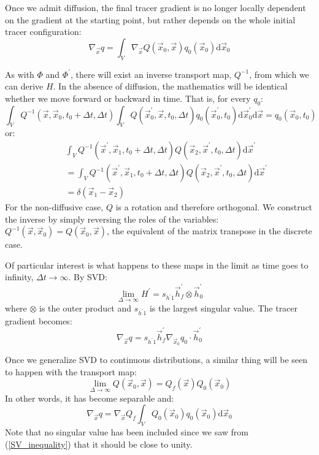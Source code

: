 \documentclass[11pt]{article}
\begin{document}
Once we admit diffusion, the final tracer gradient is no longer locally 
dependent on the gradient at the starting point, but rather depends on the
whole initial tracer configuration:
\begin{equation}
	\nabla_{\vec x} q = \int_V \nabla_{\vec x} Q(\vec x_0, \vec x) q_0 (\vec x_0) \mathrm d \vec x_0
\end{equation}

As with $\Phi$ and $\Phi^\prime$, 
there will exist an inverse transport map, $Q^{-1}$, from which we can derive
$H$. In the absence of diffusion, the mathematics will be identical whether
we move forward or backward in time.
That is, for every $q_0$:
\begin{equation}
	\int_V Q^{-1}(\vec x, \vec x_0, t_0+\Delta t, \Delta t) 
	\int_V Q(\vec x_0^\prime, \vec x, t_0, \Delta t) 
	q_0(\vec x_0^\prime, t_0) 
	\mathrm d \vec x_0^\prime \mathrm d \vec x = q_0(\vec x_0, t_0)
\end{equation}
or:
\begin{eqnarray}
	& & \int_V  Q^{-1}(\vec x^\prime, \vec x_1, t_0+\Delta t, \Delta t)
	Q(\vec x_2, \vec x^\prime, t_0, \Delta t) \mathrm d \vec x^\prime \\
	& & = \int_V  Q^{-1}(\vec x^\prime, \vec x_1, t_0+\Delta t, \Delta t)
	Q(\vec x_2, \vec x^\prime, t_0, \Delta t) \mathrm d \vec x^\prime \\ 
	& & = \delta(\vec x_1 - \vec x_2)
\end{eqnarray}
For the non-diffusive case, $Q$ is a rotation and therefore orthogonal.
We construct the inverse by simply reversing the roles of the variables:
$Q^{-1}(\vec x, \vec x_0) = Q(\vec x_0, \vec x)$, 
the equivalent of the matrix transpose in the discrete case.

Of particular interest is what happens to these maps in the limit as time
goes to infinity, $\Delta t \rightarrow \infty$.
By SVD:
\begin{equation}
	\lim_{\Delta \rightarrow \infty} H^\prime = 
	s_{h^\prime1} \vec h_f^\prime \otimes \vec h_0^\prime
\end{equation}
where $\otimes$ is the outer product and $s_{h^\prime1}$ is the largest 
singular value. The tracer gradient becomes:
\begin{equation}
	\nabla_{\vec x} q = s_{h^\prime1} \vec h_f^\prime
	\nabla_{\vec x_0} q_0 \cdot \vec h_0^\prime
\end{equation}

Once we generalize SVD to continuous distributions, a similar thing will
be seen to happen with the transport map:
\begin{equation}
	\lim_{\Delta \rightarrow \infty} Q(\vec x_0, \vec x) =
	Q_f (\vec x) Q_0 (\vec x_0)
	\label{transport_map_separable}
\end{equation}
In other words, it has become separable and:
\begin{equation}
	\nabla_{\vec x} q = \nabla_{\vec x} Q_f \int_V Q_0 (\vec x_0) q_0 (\vec x_0) \mathrm d \vec x_0
\end{equation}
Note that no singular value has been included since we saw from
(\ref{SV_inequality}) that it should be close to unity.
\end{document}
